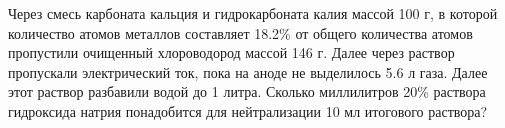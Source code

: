 Через смесь карбоната кальция и гидрокарбоната калия массой 100 г, в которой количество атомов металлов составляет 18.2\% от общего количества атомов пропустили очищенный хлороводород массой 146 г. Далее через раствор пропускали электрический ток, пока на аноде не выделилось 5.6 л газа. Далее этот раствор разбавили водой до 1 литра. Сколько миллилитров 20\% раствора гидроксида натрия понадобится для нейтрализации 10 мл итогового раствора?